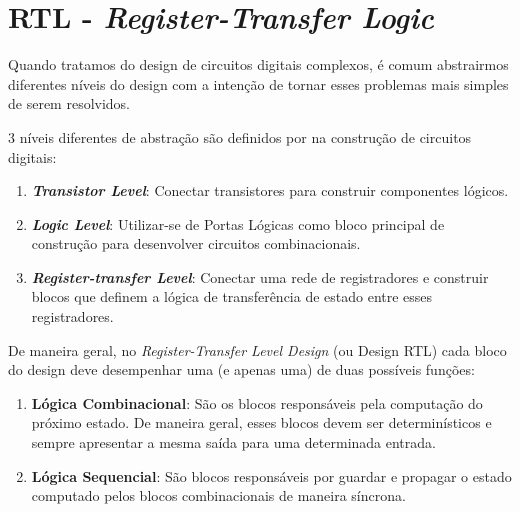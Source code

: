\documentclass[
	12pt,				  %
	openright,		%
	a4paper,			%
	english,			%
	french,				%
	spanish,			%
	brazil,				%
]{abntex2}
\begin{document}
\section{RTL - \emph{Register-Transfer Logic}}
Quando tratamos do design de circuitos digitais complexos, é comum abstrairmos
diferentes níveis do design com a intenção de tornar esses problemas mais
simples de serem resolvidos.

3 níveis diferentes de abstração são definidos por  na
construção de circuitos digitais:
\begin{enumerate}
	\item \textbf{\emph{Transistor Level}}: Conectar transistores para construir
	      componentes lógicos.
	\item \textbf{\emph{Logic Level}}: Utilizar-se de Portas Lógicas como bloco
	      principal de construção para desenvolver circuitos combinacionais.
	\item \textbf{\emph{Register-transfer Level}}: Conectar uma rede de
	      registradores e construir blocos que definem a lógica de transferência
	      de estado entre esses registradores.
\end{enumerate}

De maneira geral, no \emph{Register-Transfer Level Design} (ou Design RTL) cada
bloco do design deve desempenhar uma (e apenas uma) de duas possíveis funções:
\begin{enumerate}
	\item \textbf{Lógica Combinacional}: São os blocos responsáveis pela
	      computação do próximo estado. De maneira geral, esses blocos devem ser
	      determinísticos e sempre apresentar a mesma saída para uma determinada
	      entrada.
	\item \textbf{Lógica Sequencial}: São blocos responsáveis por guardar e
	      propagar o estado computado pelos blocos combinacionais de maneira
	      síncrona.
\end{enumerate}
\end{document}
